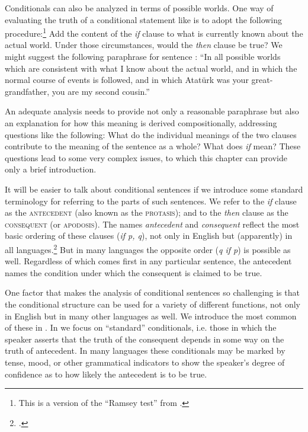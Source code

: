 Conditionals can also be analyzed in terms of possible worlds. One way of evaluating the truth of a conditional statement like  is to adopt the following procedure:\footnote{This is a version of the “Ramsey test” from \citet{Stalnaker1968}.} Add the content of the \textit{if} clause to what is currently known about the actual world. Under those circumstances, would the \textit{then} clause be true? We might suggest the following paraphrase for sentence : “In all possible worlds which are consistent with what I know about the actual world, and in which the normal course of events is followed, and in which Atatürk was your great-grandfather, you are my second cousin.”



An adequate analysis needs to provide not only a reasonable paraphrase but also an explanation for how this meaning is derived compositionally, addressing questions like the following: What do the individual meanings of the two clauses contribute to the meaning of the sentence as a whole? What does \textit{if} mean? These questions lead to some very complex issues, to which this chapter can provide only a brief introduction.



It will be easier to talk about conditional sentences if we introduce some standard terminology for referring to the parts of such sentences. We refer to the \textit{if} clause as the \textsc{antecedent} (also known as the \textsc{protasis}); and to the \textit{then} clause as the \textsc{consequent} (or \textsc{apodosis}). The names \textit{antecedent} and \textit{consequent} reflect the most basic ordering of these clauses (\textit{if p, q}), not only in English but (apparently) in all languages.\footnote{\textcites[84--85]{Greenberg1963}[83]{Comrie1986}.} But in many languages the opposite order (\textit{q if p}) is possible as well. Regardless of which comes first in any particular sentence, the antecedent names the condition under which the consequent is claimed to be true.



One factor that makes the analysis of conditional sentences so challenging is that the conditional structure can be used for a variety of different functions, not only in English but in many other languages as well. We introduce the most common of these in . In  we focus on “standard” conditionals, i.e. those in which the speaker asserts that the truth of the consequent depends in some way on the truth of antecedent. In many languages these conditionals may be marked by tense, mood, or other grammatical indicators to show the speaker’s degree of confidence as to how likely the antecedent is to be true.



